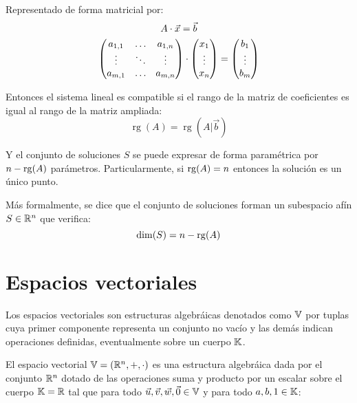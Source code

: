 \documentclass[a5paper,12pt,twoside]{book}
\begin{document}
Representado de forma matricial por:
\begin{gather*}
    A \cdot \Vec{x} = \Vec{b}
    \\
    \begin{pmatrix}
        a_{1,1} & \dots & a_{1,n}
        \\
        \vdots & \ddots & \vdots
        \\
        a_{m,1} & \dots & a_{m,n}
    \end{pmatrix}
    \cdot
    \begin{pmatrix}
        x_1
        \\
        \vdots
        \\
        x_n
    \end{pmatrix}
    =
    \begin{pmatrix}
        b_1
        \\
        \vdots
        \\
        b_m
    \end{pmatrix}
\end{gather*}

Entonces el sistema lineal es compatible si el rango de la matriz de coeficientes es igual al rango de la matriz ampliada:
\begin{equation*}
    \operatorname{rg}(A) = \operatorname{rg}\left(A\Big|\Vec{b}\right)
\end{equation*}

Y el conjunto de soluciones $S$ se puede expresar de forma paramétrica por $n-\operatorname{rg}(A)$ parámetros.
Particularmente, si $\operatorname{rg}(A)=n$ entonces la solución es un único punto.

Más formalmente, se dice que el conjunto de soluciones forman un subespacio afín $S\in\mathbb{R}^n$ que verifica:
\begin{equation*}
    \operatorname{dim}(S) = n-\operatorname{rg}(A)
\end{equation*}



\chapter{Espacios vectoriales}

Los espacios vectoriales son estructuras algebráicas denotados como $\mathbb{V}$ por tuplas cuya primer componente representa un conjunto no vacío y las demás indican operaciones definidas, eventualmente sobre un cuerpo $\mathbb{K}$.

El espacio vectorial $\mathbb{V}=(\mathbb{R}^n,+,\cdot)$ es una estructura algebráica dada por el conjunto $\mathbb{R}^n$ dotado de las operaciones suma y producto por un escalar sobre el cuerpo $\mathbb{K}=\mathbb{R}$ tal que para todo $ \Vec{u},\Vec{v},\Vec{w},\Vec{0} \in \mathbb{V}$ y para todo $a,b,1 \in \mathbb{K}$:
\end{document}
